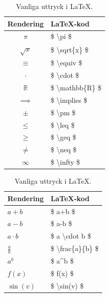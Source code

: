\documentclass[titlepage]{article}
\begin{document}
\begin{table}[h]
\begin{minipage}[b]{.5\linewidth}
    \begin{center}
    \begin{tabular}{| c | l |}
        \hline 
        \textbf{Rendering} & \textbf{\LaTeX-kod} \\
        \hline
        $\pi$ & \$ \textbackslash pi \$ \\
        \hline
        $\sqrt{ x }$ & \$ \textbackslash sqrt\{x\} \$ \\
        \hline
        $\equiv$ & \$ \textbackslash equiv \$ \\
        \hline
        $\cdot$ & \$ \textbackslash cdot \$ \\
        \hline
        $\mathbb{R}$ & \$ \textbackslash mathbb\{R\} \$ \\
        \hline
        $\implies$ & \$ \textbackslash implies \$ \\
        \hline
        $\pm$ & \$ \textbackslash pm \$ \\
        \hline
        $\leq$ & \$ \textbackslash leq \$ \\
        \hline
        $\geq$ & \$ \textbackslash geq \$ \\
        \hline
        $\neq$ & \$ \textbackslash neq \$ \\
        \hline
        $\infty$ & \$ \textbackslash infty \$ \\
        \hline
    \end{tabular}
    \caption{Vanliga symboler i \LaTeX.}
    \label{t1}
    \end{center}
\end{minipage}
\begin{minipage}[b]{.5\linewidth}
    \begin{center}
        \begin{tabular}{| l | l |}
            \hline
            \textbf{Rendering} & \textbf{\LaTeX-kod} \\
            \hline
            $a+b$ & \$ a+b \$ \\
            \hline
            $a-b$ & \$ a-b \$ \\
            \hline
            $a \cdot b$ & \$ a \textbackslash cdot b \$ \\
            \hline
            $\frac{a}{b}$ & \$ \textbackslash frac\{a\}\{b\} \$ \\
            \hline
            $a^b$ & \$ a\textasciicircum b \$ \\
            \hline
            $f(x)$ & \$ f(x) \$ \\
            \hline
            $\sin(v)$ & \$ \textbackslash sin(v) \$ \\
            \hline
        \end{tabular}
        \caption{Vanliga uttryck i \LaTeX.}
        \label{t2}
    \end{center}
\end{minipage}
\end{table}
\end{document}
